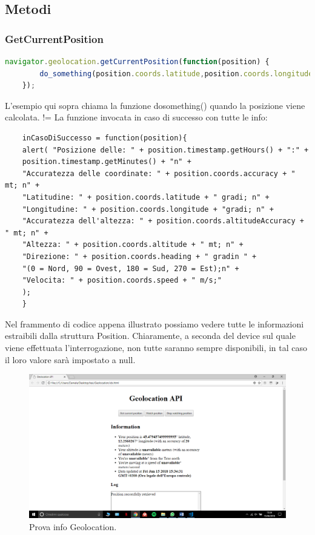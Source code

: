 \documentclass[italian]{article}
\begin{document}
	\subsection{Metodi}
	\subsubsection{GetCurrentPosition}
	\begin{lstlisting}[language=JavaScript]
	navigator.geolocation.getCurrentPosition(function(position) {
		do_something(position.coords.latitude,position.coords.longitude);
	});
	\end{lstlisting}
	\begin{flushleft}
		L'esempio qui sopra chiama la funzione dosomething() quando la posizione viene calcolata.
		!=
		La funzione invocata in caso di successo con tutte le info:
	\end{flushleft}
\pagebreak
	\begin{lstlisting}
	inCasoDiSuccesso = function(position){ 
	alert( "Posizione delle: " + position.timestamp.getHours() + ":" +
	position.timestamp.getMinutes() + "n" + 
	"Accuratezza delle coordinate: " + position.coords.accuracy + " mt; n" + 
	"Latitudine: " + position.coords.latitude + " gradi; n" + 
	"Longitudine: " + position.coords.longitude + "gradi; n" + 
	"Accuratezza dell'altezza: " + position.coords.altitudeAccuracy + " mt; n" + 
	"Altezza: " + position.coords.altitude + " mt; n" + 
	"Direzione: " + position.coords.heading + " gradin " +
	"(0 = Nord, 90 = Ovest, 180 = Sud, 270 = Est);n" + 
	"Velocita: " + position.coords.speed + " m/s;"
	);
	}
	\end{lstlisting}
	\begin{flushleft}
		Nel frammento di codice appena illustrato possiamo vedere tutte le informazioni estraibili dalla struttura Position. Chiaramente, a seconda del device sul quale viene effettuata l’interrogazione, non tutte saranno sempre disponibili, in tal caso il loro valore sarà impostato a null. 
	\end{flushleft}
	\begin{figure}[h]
		\centering
		\includegraphics[width=1\linewidth]{img}
		\caption[Prova]{Prova info Geolocation.}
		\label{fig:Info Geolocation}
	\end{figure}
\end{document}
